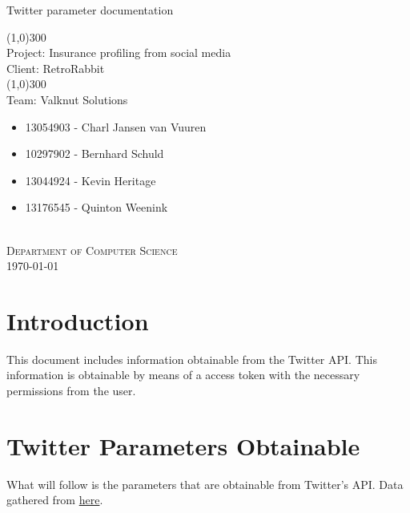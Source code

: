 \documentclass{article}
\begin{document}
	\begin{titlepage}
		\begin{center}
			\huge{
			Twitter parameter documentation\\
			}
			
			\line(1,0){300}\\
			[0.2cm]
			\LARGE{Project: Insurance profiling from social media\\
			Client: RetroRabbit} \\
			\line(1,0){300}\\
			\LARGE{Team: Valknut Solutions}\\
			[1.0cm]
			\large
			{
			\begin{itemize}
				\item 13054903 - Charl Jansen van Vuuren 
				\item 10297902 - Bernhard Schuld      
				\item 13044924 - Kevin Heritage
				\item 13176545 - Quinton Weenink\\
			\end{itemize}
			}
			\textsc{\large}\\
		[3.0cm]
		\textsc{\large  Department of Computer Science}\\
		[0.5cm]
		\textsc{\large \today}\\
		\end{center}

	\end{titlepage}
	\cleardoublepage
	\tableofcontents
	\cleardoublepage
\section{Introduction}
	This document includes information obtainable from the Twitter API. This information is obtainable by means of a access token with the necessary permissions from the user.

\section{Twitter Parameters Obtainable}
	What will follow is the parameters that are obtainable from Twitter's API.
	Data gathered from \href{https://dev.twitter.com/rest/public}{here}.
\end{document}
